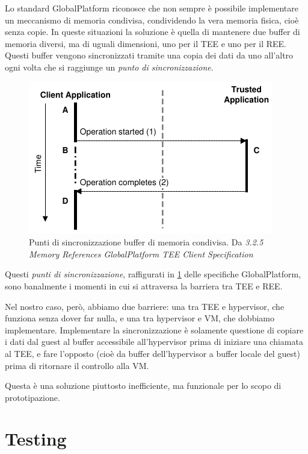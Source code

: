 \documentclass[12pt,italian]{report}
\begin{document}
Lo standard GlobalPlatform riconosce che non sempre è possibile implementare
un  meccanismo di memoria condivisa, condividendo la vera memoria fisica,
cioè senza copie.
In queste situazioni la soluzione è quella di mantenere due buffer di memoria
diversi, ma di uguali dimensioni, uno per il TEE e uno per il REE.
Questi buffer vengono sincronizzati tramite una copia dei dati da uno all'altro
ogni volta che si raggiunge un \textit{punto di sincronizzazione}.

\begin{figure}[h]
    \centering
    \includegraphics{immagini/tp-synchronization-points}
    \caption{
        Punti di sincronizzazione buffer di memoria condivisa.
        Da \textit{3.2.5 Memory References GlobalPlatform TEE Client Specification}
    }
    \label{fig:gp-punti-sincronizzazione}
\end{figure}

Questi \textit{punti di sincronizzazione}, raffigurati in
\ref{fig:gp-punti-sincronizzazione} delle specifiche GlobalPlatform,
sono banalmente i momenti in cui si attraversa la barriera tra TEE e REE.

Nel nostro caso, però, abbiamo due barriere: una tra TEE e hypervisor, che funziona
senza dover far nulla, e una tra hypervisor e VM, che dobbiamo implementare.
Implementare la sincronizzazione è solamente questione di copiare i dati dal guest
al buffer accessibile all'hypervisor prima di iniziare una chiamata al TEE, e fare
l'opposto (cioè da buffer dell'hypervisor a buffer locale del guest) prima di
ritornare il controllo alla VM.

Questa è una soluzione piuttosto inefficiente, ma funzionale per lo scopo di
prototipazione.

\chapter{Testing}
\label{chap:testing}
\end{document}
